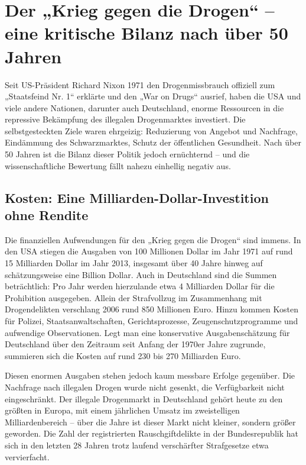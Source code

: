 \documentclass[11pt,a4paper]{article}
\begin{document}
	\section{Der „Krieg gegen die Drogen“ – eine kritische Bilanz nach über 50 Jahren}
	
	
	Seit US-Präsident Richard Nixon 1971 den Drogenmissbrauch offiziell zum „Staatsfeind Nr. 1“ erklärte und den „War on Drugs“ ausrief, haben die USA und viele andere Nationen, darunter auch Deutschland, enorme Ressourcen in die repressive Bekämpfung des illegalen Drogenmarktes investiert. Die selbstgesteckten Ziele waren ehrgeizig: Reduzierung von Angebot und Nachfrage, Eindämmung des Schwarzmarktes, Schutz der öffentlichen Gesundheit. Nach über 50 Jahren ist die Bilanz dieser Politik jedoch ernüchternd – und die wissenschaftliche Bewertung fällt nahezu einhellig negativ aus.
	
	\subsection{Kosten: Eine Milliarden-Dollar-Investition ohne Rendite}
	
	Die finanziellen Aufwendungen für den „Krieg gegen die Drogen“ sind immens. In den USA stiegen die Ausgaben von 100 Millionen Dollar im Jahr 1971 auf rund 15 Milliarden Dollar im Jahr 2013, insgesamt über 40 Jahre hinweg auf schätzungsweise eine Billion Dollar.\cite{prohibition-costs} Auch in Deutschland sind die Summen beträchtlich: Pro Jahr werden hierzulande etwa 4 Milliarden Dollar für die Prohibition ausgegeben.\cite{prohibition-costs} Allein der Strafvollzug im Zusammenhang mit Drogendelikten verschlang 2006 rund 850 Millionen Euro.\cite{drug-war-germany-costs} Hinzu kommen Kosten für Polizei, Staatsanwaltschaften, Gerichtsprozesse, Zeugenschutzprogramme und aufwendige Observationen. Legt man eine konservative Ausgabenschätzung für Deutschland über den Zeitraum seit Anfang der 1970er Jahre zugrunde, summieren sich die Kosten auf rund 230 bis 270 Milliarden Euro.\cite{germany-investment}
	
	Diesen enormen Ausgaben stehen jedoch kaum messbare Erfolge gegenüber. Die Nachfrage nach illegalen Drogen wurde nicht gesenkt, die Verfügbarkeit nicht eingeschränkt.\cite{germany-investment} Der illegale Drogenmarkt in Deutschland gehört heute zu den größten in Europa, mit einem jährlichen Umsatz im zweistelligen Milliardenbereich – über die Jahre ist dieser Markt nicht kleiner, sondern größer geworden.\cite{germany-investment} Die Zahl der registrierten Rauschgiftdelikte in der Bundesrepublik hat sich in den letzten 28 Jahren trotz laufend verschärfter Strafgesetze etwa vervierfacht.\cite{nobis-failure}
	
\end{document}
